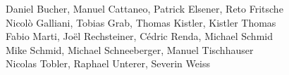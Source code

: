 %
%
%
Daniel Bucher, 			%
Manuel Cattaneo,		%
Patrick Elsener,		%
Reto Fritsche%
\\
Nicolò Galliani,		%
Tobias Grab,			%
Thomas Kistler,			%
Kistler Thomas%
\\
Fabio Marti,			%
Joël Rechsteiner,		%
Cédric Renda,			%
Michael Schmid%
\\
Mike Schmid,			%
Michael Schneeberger,		%
Manuel Tischhauser%
\\
Nicolas Tobler,			%
Raphael Unterer,		%
Severin Weiss%
